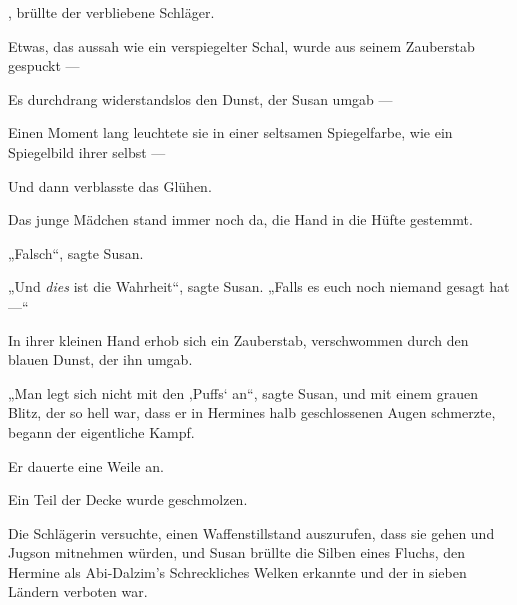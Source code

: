 , brüllte der verbliebene Schläger.

Etwas, das aussah wie ein verspiegelter Schal, wurde aus seinem Zauberstab gespuckt —

Es durchdrang widerstandslos den Dunst, der Susan umgab —

Einen Moment lang leuchtete sie in einer seltsamen Spiegelfarbe, wie ein Spiegelbild ihrer selbst —

Und dann verblasste das Glühen.

Das junge Mädchen stand immer noch da, die Hand in die Hüfte gestemmt.

„Falsch“, sagte Susan.

„Und \emph{dies} ist die Wahrheit“, sagte Susan.
„Falls es euch noch niemand gesagt hat —“

In ihrer kleinen Hand erhob sich ein Zauberstab, verschwommen durch den blauen Dunst, der ihn umgab.

„Man legt sich nicht mit den ‚Puffs‘ an“, sagte Susan, und mit einem grauen Blitz, der so hell war, dass er in Hermines halb geschlossenen Augen schmerzte, begann der eigentliche Kampf.

Er dauerte eine Weile an.

Ein Teil der Decke wurde geschmolzen.

Die Schlägerin versuchte, einen Waffenstillstand auszurufen, dass sie gehen und Jugson mitnehmen würden, und Susan brüllte die Silben eines Fluchs, den Hermine als Abi-Dalzim’s Schreckliches Welken erkannte und der in sieben Ländern verboten war.

